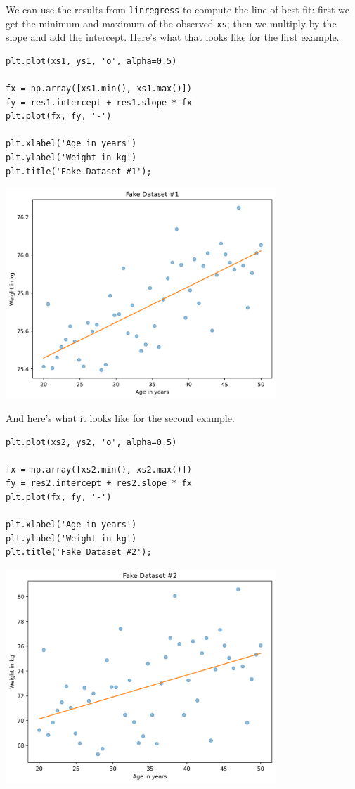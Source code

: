 We can use the results from \passthrough{\lstinline!linregress!} to
compute the line of best fit: first we get the minimum and maximum of
the observed \passthrough{\lstinline!xs!}; then we multiply by the slope
and add the intercept. Here's what that looks like for the first
example.

\begin{lstlisting}[]
plt.plot(xs1, ys1, 'o', alpha=0.5)

fx = np.array([xs1.min(), xs1.max()])
fy = res1.intercept + res1.slope * fx
plt.plot(fx, fy, '-')

plt.xlabel('Age in years')
plt.ylabel('Weight in kg')
plt.title('Fake Dataset #1');
\end{lstlisting}

\begin{center}
\includegraphics[width=4in]{chapters/09_relationships_files/09_relationships_87_0.png}
\end{center}

And here's what it looks like for the second example.

\begin{lstlisting}[]
plt.plot(xs2, ys2, 'o', alpha=0.5)

fx = np.array([xs2.min(), xs2.max()])
fy = res2.intercept + res2.slope * fx
plt.plot(fx, fy, '-')

plt.xlabel('Age in years')
plt.ylabel('Weight in kg')
plt.title('Fake Dataset #2');
\end{lstlisting}

\begin{center}
\includegraphics[width=4in]{chapters/09_relationships_files/09_relationships_89_0.png}
\end{center}

